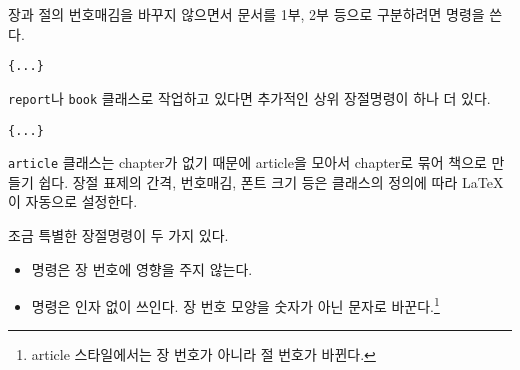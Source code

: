 장과 절의 번호매김을 바꾸지 않으면서 문서를 1부, 2부 등으로 구분하려면  명령을 쓴다.
\begin{lscommand}
\verb|{...}|
\end{lscommand}

\texttt{report}나 \texttt{book} 클래스로 작업하고 있다면 추가적인 상위 장절명령이 하나 더 있다.
\begin{lscommand}
\verb|{...}|
\end{lscommand}

\texttt{article} 클래스는 chapter가 없기 때문에 article을 모아서 chapter로 묶어 책으로 만들기 쉽다.
장절 표제의 간격, 번호매김, 폰트 크기 등은 클래스의 정의에 따라 \LaTeX 이 자동으로 설정한다.

조금 특별한 장절명령이 두 가지 있다.
\begin{itemize} \firmlist
\item {} 
    명령은 장 번호에 영향을 주지 않는다.
\item {} 
    명령은 인자 없이 쓰인다. 장 번호 모양을 숫자가 아닌 문자로 바꾼다.\footnote{article 스타일에서는 장 번호가 아니라 절 번호가 바뀐다.}
\end{itemize}

